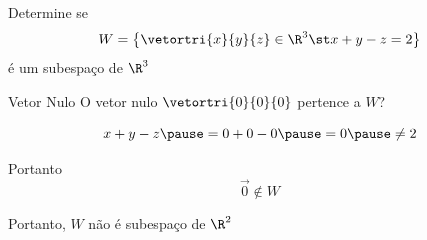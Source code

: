 \begin{question}
  Determine se
  \[
    W = \left\{ \vetortri{x}{y}{z} \in\R^{3} \st x+y-z = 2 \right\}
  \]
  é um subespaço de $\R^{3}$
\end{question}

\begin{resolution}{Vetor Nulo}
  O vetor nulo \(\vetortri{0}{0}{0}\) pertence a $W$?

  \pause
  \[
    x + y - z
    \pause
    = 0 + 0 - 0
    \pause
    = 0
    \pause
    \neq 2
  \]

  \pause
  Portanto
  \[
    \vec{0} \notin W
  \]

  \pause
  Portanto, $W$ não é subespaço de $\R^{2}$
\end{resolution}

\endinput
